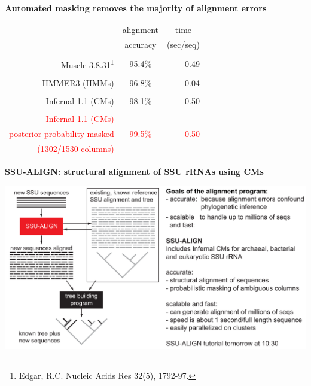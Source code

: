 \documentclass[landscape]{slides}
\begin{document}
\begin{slide}
\begin{center}

\textbf{Automated masking removes the majority of alignment errors}
\end{center}
\medskip
\medskip
\begin{center}

\begin{tabular}{rcr} 
& \multicolumn{1}{c}{alignment} & \multicolumn{1}{c}{time} \\
& \multicolumn{1}{c}{accuracy} & \multicolumn{1}{c}{(sec/seq)} \\ \hline
& \multicolumn{1}{c}{} & \multicolumn{1}{c}{} \\
Muscle-3.8.31\footnote{Edgar, R.C. Nucleic Acids Res 32(5), 1792-97.} & 95.4\% & 0.49 \\ 
& \multicolumn{1}{c}{} & \multicolumn{1}{c}{} \\
HMMER3 (HMMs) & 96.8\% & 0.04 \\ 
& \multicolumn{1}{c}{} & \multicolumn{1}{c}{} \\
Infernal 1.1 (CMs) & 98.1\% & 0.50 \\
& \multicolumn{1}{c}{} & \multicolumn{1}{c}{} \\
\textcolor{red}{Infernal 1.1 (CMs)} & & \\
\textcolor{red}{posterior probability masked} & \textcolor{red}{99.5\%} & \textcolor{red}{0.50} \\ %
\textcolor{red}{(1302/1530 columns)} & & \\
\end{tabular}
\end{center}


\vfill
\end{slide}
\begin{slide}
\begin{center}
\textbf{SSU-ALIGN: structural alignment of SSU rRNAs using CMs}
\end{center}

\includegraphics[width=10in]{figs/seq2tree-2013-ssu-align}

\vfill
\end{slide}
\end{document}
